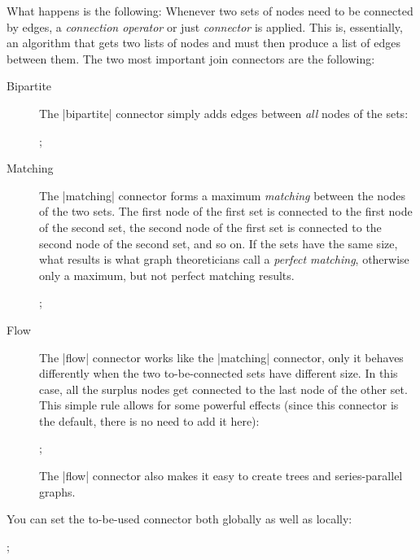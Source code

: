 What happens is the following: Whenever two sets of nodes need to be
connected by edges, a \emph{connection operator} or just
\emph{connector} is applied. This is, essentially, an algorithm that
gets two lists of nodes and must then produce a list of edges between
them. The two most important join connectors are the following:
\begin{description}
\item[Bipartite] The |bipartite| connector simply adds edges
  between \emph{all} nodes of the sets:
  \begin{codeexample}[]
\tikz {};    
  \end{codeexample}
\item[Matching] The |matching| connector forms a maximum
  \emph{matching} between the nodes of the two sets. The first node of
  the first set is connected to the first node of 
  the second set, the second node of the first set is connected to the
  second node of the second set, and so on. If the sets have the same
  size, what results is what graph theoreticians call a \emph{perfect
    matching}, otherwise only a maximum, but not perfect matching
  results. 
  \begin{codeexample}[]
\tikz {};    
  \end{codeexample}
\item[Flow] The |flow| connector works like the |matching|
  connector, only it behaves differently when the two to-be-connected
  sets have different size. In this case, all the surplus nodes get
  connected to the last node of the other set. This simple rule allows
  for some powerful effects (since this connector is the default,
  there is no need to add it here):
  \begin{codeexample}[]
\tikz {};    
  \end{codeexample}
  The |flow| connector also makes it easy to create trees and
  series-parallel graphs.
\end{description}

You can set the to-be-used connector both globally as well as
locally:

\begin{codeexample}[]
\tikz {};    
\end{codeexample}



